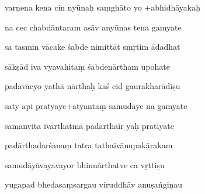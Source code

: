 \documentclass[article,12pt,a4paper]{memoir}%
\newcounter{parCount}
\begin{document}
	  
	  \pstart {} varṇena kena cin nyūnaḥ saṃghāto yo +abhidhāyakaḥ 
	{}
	\pend%
      

	  
	  \pstart \leavevmode%
	na cec chabdāntaram asāv anyūnas tena gamyate 
	{}
	\pend%
      

	  
	  \pstart {} sa tasmin vācake śabde nimittāt smṛtim ādadhat 
	{}
	\pend%
      

	  
	  \pstart \leavevmode%
	sākṣād iva vyavahitaṃ śabdenārtham upohate 
	{}
	\pend%
      

	  
	  \pstart {} padavācyo yathā nārthaḥ kaś cid gaurakharādiṣu 
	{}
	\pend%
      

	  
	  \pstart \leavevmode%
	saty api pratyaye+atyantaṃ samudāye na gamyate 
	{}
	\pend%
      

	  
	  \pstart {} samanvita ivārthātmā padārthair yaḥ pratīyate 
	{}
	\pend%
      

	  
	  \pstart \leavevmode%
	padārthadarśanaṃ tatra tathaivānupakārakam 
	{}
	\pend%
      

	  
	  \pstart {} samudāyāvayavayor bhinnārthatve ca vṛttiṣu 
	{}
	\pend%
      

	  
	  \pstart \leavevmode%
	yugapad bhedasaṃsargau viruddhāv anuṣaṅgiṇau 
	{}
	\pend%
      
\end{document}

